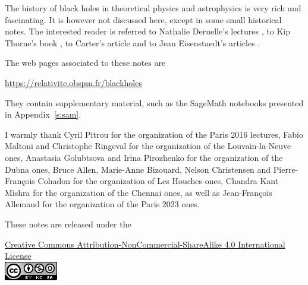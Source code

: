 The history of black holes in theoretical physics and astrophysics is
very rich and fascinating. It is however not discussed here, except in some
small historical notes. The interested
reader is referred to Nathalie Deruelle's lectures \cite{Derue09}, to Kip Thorne's
book \cite{Thorn94}, to Carter's article \cite{Carte06}
and to Jean Eisenstaedt's articles \cite{Eisen82,Eisen93}.


The web pages associated to these notes are
\begin{center}
\url{https://relativite.obspm.fr/blackholes}
\end{center}
They contain supplementary material, such as the SageMath notebooks presented in
Appendix~\ref{s:sam}.

\vspace{2ex}

I warmly thank Cyril Pitrou for the organization of the Paris 2016 lectures,
Fabio Maltoni and Christophe Ringeval for the organization of the Louvain-la-Neuve ones,
Anastasia Golubtsova and Irina Pirozhenko for the
organization of the Dubna ones, Bruce Allen, Marie-Anne Bizouard, Nelson
Christensen and Pierre-François Cohadon for the organization of Les Houches ones,
Chandra Kant Mishra for the organization of the Chennai ones,
as well as Jean-François Allemand for the organization of the Paris 2023 ones.

\vspace{3ex}
These notes are released under the
\begin{center}
\href{https://creativecommons.org/licenses/by-nc-sa/4.0/}{{Creative Commons Attribution-NonCommercial-ShareAlike 4.0 International License}}\\[1ex]
\includegraphics[height=0.03\textheight]{cc_license.png}
\end{center}

